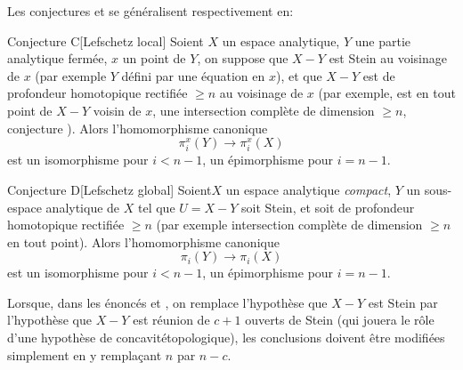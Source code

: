 Les conjectures  et  se g\'en\'eralisent respectivement en:

 \label{XIII.6.C}
\begin{enonce*}{Conjecture C}[\og Lefschetz local{\fg}\ndemark]
Soient $X$ un espace analytique, $Y$ une partie analytique ferm\'ee, $x$ un point de $Y$, on suppose que $X-Y$ est Stein au voisinage de $x$ (par exemple $Y$ d\'efini par une \'equation en $x$), et que $X-Y$ est de profondeur homotopique rectifi\'ee $\geq n$ au voisinage de $x$ (par exemple, est en tout point de $X-Y$ voisin de $x$, une intersection compl\`ete de dimension $\geq n$, \cf conjecture ). Alors l'homomorphisme canonique
$$
\pi_i^x(Y)\to\pi_i^x(X)$$
est un isomorphisme pour $i<n-1$, un \'epimorphisme pour $i=n-1$.
\end{enonce*}

 \label{XIII.6.D}
\begin{enonce*}{Conjecture D}[\og Lefschetz global{\fg}\ndemark]
Soient\pageoriginaled $X$ un espace analytique \emph{compact}, $Y$ un sous-espace analytique de $X$ tel que $U=X-Y$ soit Stein, et soit de profondeur homotopique rectifi\'ee $\geq n$ (par exemple intersection compl\`ete de dimension $\geq n$ en tout point). Alors l'homomorphisme canonique
$$
\pi_i(Y)\to\pi_i(X)$$
est un isomorphisme pour $i<n-1$, un \'epimorphisme pour $i=n-1$.
\end{enonce*}

\begin{remarquestar}
Lorsque, dans les \'enonc\'es  et , on
remplace l'hypoth\`ese que $X-Y$ est Stein par l'hypoth\`ese que
$X-Y$ est r\'eunion de $c+1$ ouverts de Stein (qui jouera le
r\^{o}le d'une hypoth\`ese de \og concavit\'e\fg topologique), les
conclusions doivent \^etre modifi\'ees simplement en y rempla\c cant
$n$ par $n-c$.
\end{remarquestar}

